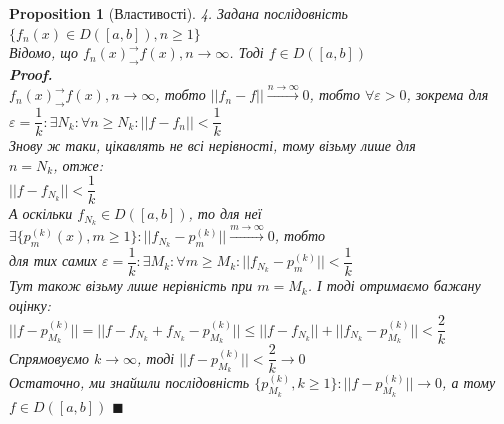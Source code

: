 \documentclass[a4paper, 14pt]{extarticle}
\def\bigline{\vspace{5mm}\\}
\theoremstyle{theoremdd}
\theoremstyle{theoremdd}
\theoremstyle{theoremdd}
\theoremstyle{theoremdd}
\theoremstyle{theoremdd}
\newtheorem{proposition}[theorem]{Proposition}
\theoremstyle{theoremdd}
\theoremstyle{theoremdd}
\theoremstyle{theoremdd}
\newenvironment{pfNoTh}{\textbf{Proof. \\}}{$\blacksquare$}
\begin{document}
\begin{proposition}[Властивості]
4. Задана послідовність $\{f_n(x) \in D([a,b]), n \geq 1 \}$ \\ Відомо, що $f_n(x)^\rightarrow_\rightarrow f(x), n \to \infty$.
Тоді $f \in D([a,b])$\\
\begin{pfNoTh}
$f_n(x)^\rightarrow_\rightarrow f(x), n \to \infty$, тобто $||f_n - f|| \overset{n \to \infty}{\longrightarrow} 0$, тобто $\forall \varepsilon > 0$, зокрема для \\
$\varepsilon = \dfrac{1}{k}: \exists N_k: \forall n \geq N_k: ||f-f_n|| < \dfrac{1}{k}$\\
Знову ж таки, цікавлять не всі нерівності, тому візьму лише для \\ $n = N_k$, отже:\\
$||f-f_{N_k}|| < \dfrac{1}{k}$\\
А оскільки $f_{N_k} \in D([a,b])$, то для неї \\ $\exists \{p_m^{(k)}(x), m \geq 1\}: ||f_{N_k} - p_m^{(k)}|| \overset{m \to \infty}{\longrightarrow} 0$, тобто\\
для тих самих $\varepsilon = \dfrac{1}{k}: \exists M_k: \forall m \geq M_k: ||f_{N_k} - p_m^{(k)}|| < \dfrac{1}{k}$\\
Тут також візьму лише нерівність при $m = M_k$. І тоді отримаємо бажану оцінку:\\
$||f-p_{M_k}^{(k)}|| = ||f - f_{N_k} + f_{N_k} -p_{M_k}^{(k)}|| \leq ||f-f_{N_k}|| + ||f_{N_k} -p_{M_k}^{(k)}|| < \dfrac{2}{k}$\\
Спрямовуємо $k \to \infty$, тоді $||f - p_{M_k}^{(k)}|| < \dfrac{2}{k} \to 0$\\
Остаточно, ми знайшли послідовність $\{p_{M_k}^{(k)}, k \geq 1\}: ||f - p_{M_k}^{(k)}|| \to 0$, а тому $f \in D([a,b])$
\end{pfNoTh}
\bigline


\end{proposition}
\end{document}
